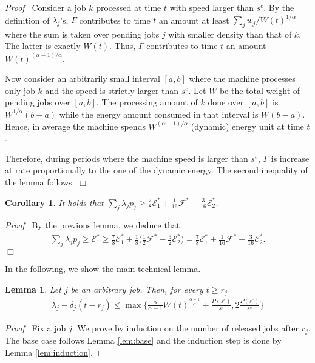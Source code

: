 \documentclass[11pt]{article}
\newenvironment{proof}{\noindent\emph{Proof\ }}{\hspace*{\fill}$\Box$\medskip}
\newtheorem{lemma}{Lemma}
\newtheorem{corollary}{Corollary}
\begin{document}
\begin{proof}
Consider a job $k$ processed at time $t$ with speed larger than $s^{c}$. 
By the definition of $\lambda_{j}$'s, 
$\Gamma$ contributes to time $t$ an amount at least $\sum_{j} w_{j}/ W(t)^{1/\alpha}$ where
the sum is taken over pending jobs $j$ with smaller density than that of $k$.
The latter is exactly $W(t)$. Thus, $\Gamma$ contributes to time $t$
an amount $W(t)^{(\alpha-1)/\alpha}$.

Now consider an arbitrarily small interval $[a,b]$ where the machine processes only job $k$
and the speed is strictly larger than $s^{c}$.
Let $W$ be the total weight of pending jobs over $[a,b]$.  The processing 
amount of $k$ done over $[a,b]$ is $ W^{1/\alpha}(b-a)$ while the 
energy amount consumed in that interval is $ W(b-a)$. Hence, 
in average the machine spends $W^{(\alpha-1)/\alpha}$ 
(dynamic) energy unit at time $t$.     

Therefore, during periods where the machine speed is larger than $s^{c}$,
$\Gamma$ is increase at rate proportionally to the one of the dynamic energy.
The second inequality of the lemma follows.
\end{proof}

\begin{corollary}		\label{cor:general-energy-lambda}
It holds that
$
 	\sum_{j} \lambda_{j}p_{j}
		\geq\frac{7}{8}\mathcal{E}^{*}_{1} + 
			 \frac{1}{16}\mathcal{F}^{*} - \frac{3}{16} \mathcal{E}^{*}_{2}
$.
\end{corollary}
\begin{proof}
By the previous lemma, we deduce that
\begin{align*}
	\sum_{j} \lambda_{j}p_{j}
		\geq \mathcal{E}^{*}_{1} 
		\geq \frac{7}{8}\mathcal{E}^{*}_{1} + 
			\frac{1}{8} \biggl(
					\frac{1}{2}\mathcal{F}^{*} - \frac{3}{2} \mathcal{E}^{*}_{2} \biggl)
		=  \frac{7}{8}\mathcal{E}^{*}_{1} + 
			 \frac{1}{16}\mathcal{F}^{*} - \frac{3}{16} \mathcal{E}^{*}_{2}.
\end{align*}
\end{proof}

In the following, we show the main technical lemma.

\begin{lemma}		\label{lem:energy-general-main}
Let $j$ be an arbitrary job.  
Then, for every $t \geq r_{j}$
\begin{align}		\label{eq:energy-general-main}
\lambda_{j} - \delta_{j} (t-r_{j}) \leq \max \biggl\{ \frac{\alpha}{\alpha-1} W(t)^{\frac{\alpha-1}{\alpha}} 
		+ \frac{P(s^{c})}{s^{c}}, 2\frac{P(s^{c})}{s^{c}} \biggl \} 
\end{align}
\end{lemma} 
\begin{proof}
Fix a job $j$. 
We prove by induction on the number of released jobs
after $r_{j}$. The base case follows Lemma \ref{lem:base}
and the induction step is done by Lemma \ref{lem:induction}. 
\end{proof}
\end{document}
